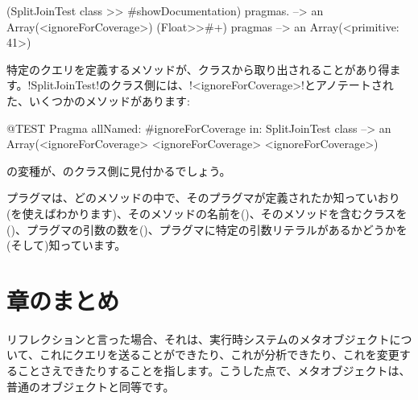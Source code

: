 \documentclass[a4paper,10pt,twoside]{book}
\begin{document}
\begin{code}{}
(SplitJoinTest class >> #showDocumentation) pragmas.
  --> an Array(<ignoreForCoverage>)
(Float>>#+) pragmas --> an Array(<primitive: 41>)
\end{code}

特定のクエリを定義するメソッドが、クラスから取り出されることがあり得ます。\ct!SplitJoinTest!のクラス側には、\ct!<ignoreForCoverage>!とアノテートされた、いくつかのメソッドがあります: %

\begin{code}{@TEST}
Pragma allNamed: #ignoreForCoverage in: SplitJoinTest class  --> an Array(<ignoreForCoverage> <ignoreForCoverage> <ignoreForCoverage>)
\end{code}

の変種が、のクラス側に見付かるでしょう。

プラグマは、どのメソッドの中で、そのプラグマが定義されたか知っていおり(を使えばわかります)、そのメソッドの名前を()、そのメソッドを含むクラスを()、プラグマの引数の数を()、プラグマに特定の引数リテラルがあるかどうかを(そして)知っています。 


\section{章のまとめ}

リフレクションと言った場合、それは、実行時システムのメタオブジェクトについて、これにクエリを送ることができたり、これが分析できたり、これを変更することさえできたりすることを指します。こうした点で、メタオブジェクトは、普通のオブジェクトと同等です。
\end{document}
